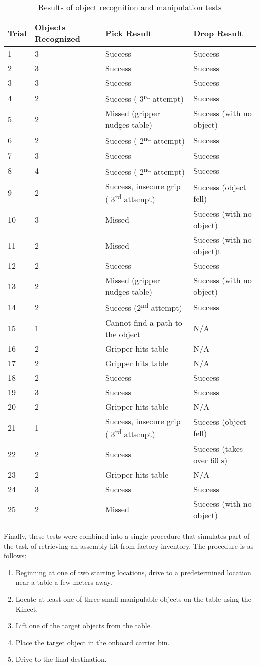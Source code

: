 \documentclass[]{cwru} %
\begin{document}
\begin{longtable}[c]{lp{2.5cm}ll}
\caption{Results of object recognition and manipulation tests}
\label{tab:object-recognition}\tabularnewline
\endfirsthead
\toprule
\textbf{Trial} & \textbf{Objects Recognized} & \textbf{Pick Result} &
\textbf{Drop Result}\tabularnewline
\midrule
\endhead
1 & 3 & Success & Success\tabularnewline
2 & 3 & Success & Success\tabularnewline
3 & 3 & Success & Success\tabularnewline
4 & 2 & Success ( 3\textsuperscript{rd} attempt) &
Success\tabularnewline
5 & 2 & Missed (gripper nudges table) & Success (with no
object)\tabularnewline
6 & 2 & Success ( 2\textsuperscript{nd} attempt) &
Success\tabularnewline
7 & 3 & Success & Success\tabularnewline
8 & 4 & Success ( 2\textsuperscript{nd} attempt) &
Success\tabularnewline
9 & 2 & Success, insecure grip ( 3\textsuperscript{rd} attempt) &
Success (object fell)\tabularnewline
10 & 3 & Missed & Success (with no object)\tabularnewline
11 & 2 & Missed & Success (with no object)t\tabularnewline
12 & 2 & Success & Success\tabularnewline
13 & 2 & Missed (gripper nudges table) & Success (with no
object)\tabularnewline
14 & 2 & Success (2\textsuperscript{nd} attempt) &
Success\tabularnewline
15 & 1 & Cannot find a path to the object & N/A\tabularnewline
16 & 2 & Gripper hits table & N/A\tabularnewline
17 & 2 & Gripper hits table & N/A\tabularnewline
18 & 2 & Success & Success\tabularnewline
19 & 3 & Success & Success\tabularnewline
20 & 2 & Gripper hits table & N/A\tabularnewline
21 & 1 & Success, insecure grip ( 3\textsuperscript{rd} attempt) &
Success (object fell)\tabularnewline
22 & 2 & Success & Success (takes over 60 s)\tabularnewline
23 & 2 & Gripper hits table & N/A\tabularnewline
24 & 3 & Success & Success\tabularnewline
25 & 2 & Missed & Success (with no object)\tabularnewline
\bottomrule
\end{longtable}

Finally, these tests were combined into a single procedure that
simulates part of the task of retrieving an assembly kit from factory
inventory. The procedure is as follows:

\begin{enumerate}
\def\labelenumi{\arabic{enumi}.}
\item
  Beginning at one of two starting locations, drive to a predetermined
  location near a table a few meters away.
\item
  Locate at least one of three small manipulable objects on the table
  using the Kinect.
\item
  Lift one of the target objects from the table.
\item
  Place the target object in the onboard carrier bin.
\item
  Drive to the final destination.
\end{enumerate}
\end{document}
